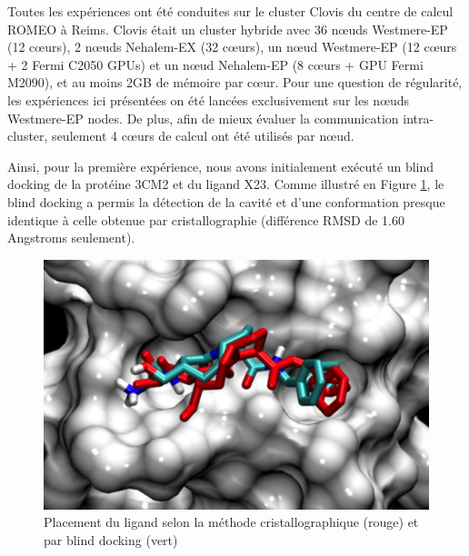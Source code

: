 Toutes les expériences ont été conduites sur le cluster Clovis du centre de calcul ROMEO à Reims. Clovis était un cluster hybride avec 36 n{\oe}uds Westmere-EP (12 c{\oe}urs), 2 n{\oe}uds Nehalem-EX (32 c{\oe}urs), un n{\oe}ud Westmere-EP (12 c{\oe}urs + 2 Fermi C2050 GPUs) et un n{\oe}ud Nehalem-EP (8 c{\oe}urs + GPU Fermi M2090), et au moins 2GB de mémoire par c{\oe}ur. Pour une question de régularité, les expériences ici présentées on été lancées exclusivement sur les n{\oe}uds Westmere-EP nodes. De plus, afin de mieux évaluer la communication intra-cluster, seulement 4 c{\oe}urs de calcul ont été utilisés par n{\oe}ud.
 
 Ainsi, pour la première expérience, nous avons initialement exécuté un blind docking de la protéine 3CM2 et du ligand X23. Comme illustré en  Figure \ref{fig:blind}, le blind docking a permis la détection de la cavité et d'une conformation presque identique à celle obtenue par cristallographie (différence RMSD de 1.60 Angstroms seulement).
 
 \begin{figure}[h]
 	\begin{center}
 		\includegraphics[width=0.85\linewidth]{images/Romain/fig4-color} 
 		\caption{Placement du ligand selon la méthode cristallographique (rouge) et par blind docking (vert)}\label{fig:blind}\vspace{-0.3cm}
 	\end{center}
 \end{figure}
 
